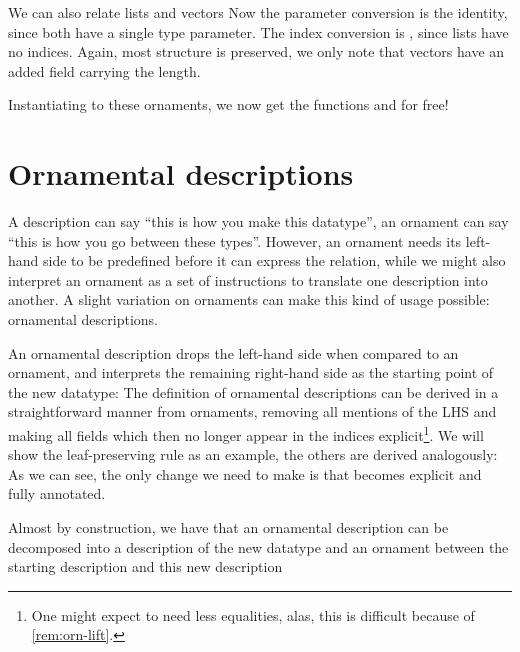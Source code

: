 We can also relate lists and vectors
Now the parameter conversion is the identity, since both have a single type parameter. The index conversion is \AgdaFunction{!}, since lists have no indices. Again, most structure is preserved, we only note that vectors have an added field carrying the length.

Instantiating  to these ornaments, we now get the functions  and  for free!



\section{\added{}Ornamental descriptions}
A description can say ``this is how you make this datatype'', an ornament can say ``this is how you go between these types''. However, an ornament needs its left-hand side to be predefined before it can express the relation, while we might also interpret an ornament as a set of instructions to translate one description into another. A slight variation on ornaments can make this kind of usage possible: ornamental descriptions.

An ornamental description drops the left-hand side when compared to an ornament, and interprets the remaining right-hand side as the starting point of the new datatype:
The definition of ornamental descriptions can be derived in a straightforward manner from ornaments, removing all mentions of the LHS and making all fields which then no longer appear in the indices explicit\footnote{One might expect to need less equalities, alas, this is difficult because of \autoref{rem:orn-lift}.}. We will show the leaf-preserving rule as an example, the others are derived analogously:
As we can see, the only change we need to make is that  becomes explicit and fully annotated.

Almost by construction, we have that an ornamental description can be decomposed into a description of the new datatype
and an ornament between the starting description and this new description


